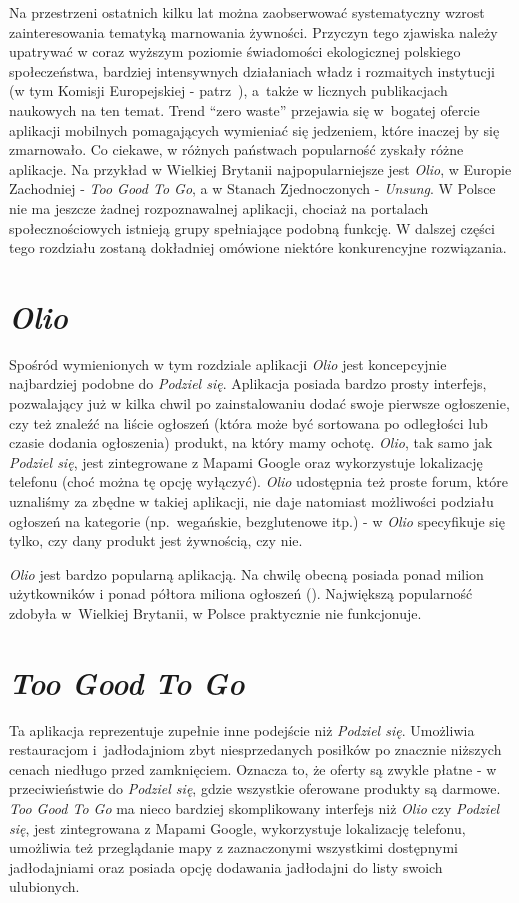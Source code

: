 \documentclass[licencjacka]{pracamgr}
\begin{document}
Na przestrzeni ostatnich kilku lat można zaobserwować systematyczny wzrost zainteresowania tematyką marnowania żywności. Przyczyn tego zjawiska należy upatrywać w coraz wyższym poziomie świadomości ekologicznej polskiego społeczeństwa, bardziej intensywnych działaniach władz i rozmaitych instytucji (w tym Komisji Europejskiej - patrz~\cite{ec}), a~także w licznych publikacjach naukowych na ten temat. Trend ``zero waste'' przejawia się w~bogatej ofercie aplikacji mobilnych pomagających wymieniać się jedzeniem, które inaczej by się zmarnowało. Co ciekawe, w różnych państwach popularność zyskały różne aplikacje. Na przykład w Wielkiej Brytanii najpopularniejsze jest \textit{Olio}, w Europie Zachodniej - \textit{Too Good To Go}, a w Stanach Zjednoczonych - \textit{Unsung}. W Polsce nie ma jeszcze żadnej rozpoznawalnej aplikacji, chociaż na portalach społecznościowych istnieją grupy spełniające podobną funkcję. W dalszej części tego rozdziału zostaną dokładniej omówione niektóre konkurencyjne rozwiązania.

\section{\textit{Olio}}
Spośród wymienionych w tym rozdziale aplikacji \textit{Olio} jest koncepcyjnie najbardziej podobne do \textit{Podziel się}. Aplikacja posiada bardzo prosty interfejs, pozwalający już w kilka chwil po zainstalowaniu dodać swoje pierwsze ogłoszenie, czy też znaleźć na liście ogłoszeń (która może być sortowana po odległości lub czasie dodania ogłoszenia) produkt, na który mamy ochotę. \textit{Olio}, tak samo jak \textit{Podziel się}, jest zintegrowane z Mapami Google oraz wykorzystuje lokalizację telefonu (choć można tę opcję wyłączyć). \textit{Olio} udostępnia też proste forum, które uznaliśmy za zbędne w takiej aplikacji, nie daje natomiast możliwości podziału ogłoszeń na kategorie (np.\ wegańskie, bezglutenowe itp.) - w \textit{Olio} specyfikuje się tylko, czy dany produkt jest żywnością, czy nie.

\textit{Olio} jest bardzo popularną aplikacją. Na chwilę obecną posiada ponad milion użytkowników i ponad półtora miliona ogłoszeń (\cite{olio}). Największą popularność zdobyła w~Wielkiej Brytanii, w Polsce praktycznie nie funkcjonuje.

\section{\textit{Too Good To Go}}
Ta aplikacja reprezentuje zupełnie inne podejście niż \textit{Podziel się}. Umożliwia restauracjom i~jadłodajniom zbyt niesprzedanych posiłków po znacznie niższych cenach niedługo przed zamknięciem. Oznacza to, że oferty są zwykle płatne - w przeciwieństwie do \textit{Podziel się}, gdzie wszystkie oferowane produkty są darmowe. \textit{Too Good To Go} ma nieco bardziej skomplikowany interfejs niż \textit{Olio} czy \textit{Podziel się}, jest zintegrowana z Mapami Google, wykorzystuje lokalizację telefonu, umożliwia też przeglądanie mapy z zaznaczonymi wszystkimi dostępnymi jadłodajniami oraz posiada opcję dodawania jadłodajni do listy swoich ulubionych.
\end{document}
